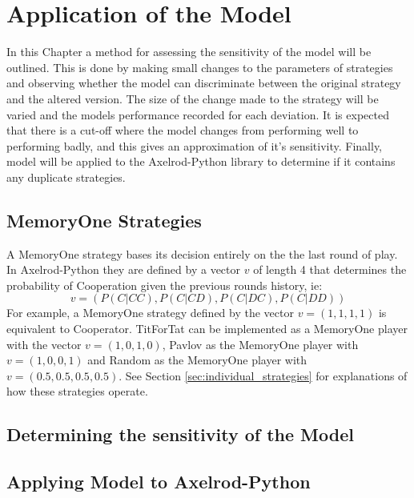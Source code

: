 
\chapter{Application of the Model}\label{cha:applying-model}

In this Chapter a method for assessing the sensitivity of the model will be outlined.
This is done by making small changes to the parameters of strategies and observing whether the model can discriminate between the original strategy and the altered version.
The size of the change made to the strategy will be varied and the models performance recorded for each deviation.
It is expected that there is a cut-off where the model changes from performing well to performing badly, and this gives an approximation of it's sensitivity.
Finally, model will be applied to the Axelrod-Python library to determine if it contains any duplicate strategies.



\section{MemoryOne Strategies}

A MemoryOne strategy bases its decision entirely on the the last round of play.
In Axelrod-Python they are defined by a vector $v$ of length 4 that determines the probability of Cooperation given the previous rounds history, ie:
$$
v = (P(C|CC), P(C|CD), P(C|DC), P(C|DD))
$$
For example, a MemoryOne strategy defined by the vector $v=(1, 1, 1, 1)$ is equivalent to Cooperator.
TitForTat can be implemented as a MemoryOne player with the vector $v=(1, 0, 1, 0)$, Pavlov as the MemoryOne player with $v=(1, 0, 0, 1)$ and Random as the MemoryOne player with $v=(0.5, 0.5, 0.5, 0.5)$.
See Section \ref{sec:individual_strategies} for explanations of how these strategies operate.



\section{Determining the sensitivity of the Model}




\section{Applying Model to Axelrod-Python}


